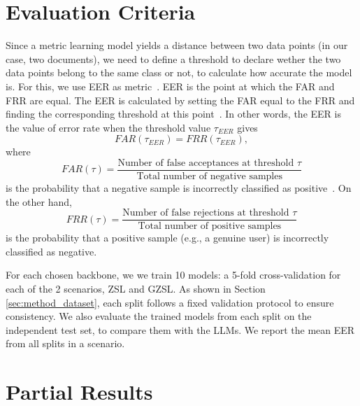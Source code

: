 \section{Evaluation Criteria}
\label{sec:evaluation}

Since a metric learning model yields a distance between two data points (in our case, two documents), we need to define a threshold to declare wether the two data points belong to the same class or not, to calculate how accurate the model is. For this, we use \gls{EER} as metric~\cite{EER}. \gls{EER} is  the point at which the \gls{FAR} and \gls{FRR} are equal. The \gls{EER} is calculated by setting the \gls{FAR} equal to the \gls{FRR} and finding the corresponding threshold at this point~\cite{EER2}. In other words, the \gls{EER} is the value of error rate when the threshold value $\tau_{EER}$ gives 
\begin{equation}
    FAR(\tau_{EER}) = FRR(\tau_{EER}),
\end{equation}
where
\begin{equation} \label{far}
    FAR(\tau) = \frac{\text{Number of false acceptances at threshold~} \tau}{\text{Total number of negative samples}}
\end{equation}
is the probability that a negative sample is incorrectly classified as positive~\cite{EER3}. On the other hand,
\begin{equation} \label{frr}
    FRR(\tau) = \frac{\text{Number of false rejections at threshold~} \tau}{\text{Total number of positive samples}}
\end{equation}
is the probability that a positive sample (e.g., a genuine user) is incorrectly classified as negative.

For each chosen backbone, we we train 10 models: a 5-fold cross-validation for each of the 2 scenarios, \gls{ZSL} and \gls{GZSL}. As shown in Section \ref{sec:method_dataset}, each split follows a fixed validation protocol to ensure consistency. We also evaluate the trained models from each split on the independent test set, to compare them with the \gls{LLM}s. We report the mean \gls{EER} from all splits in a scenario.

\section{Partial Results}
\label{sec:results}


